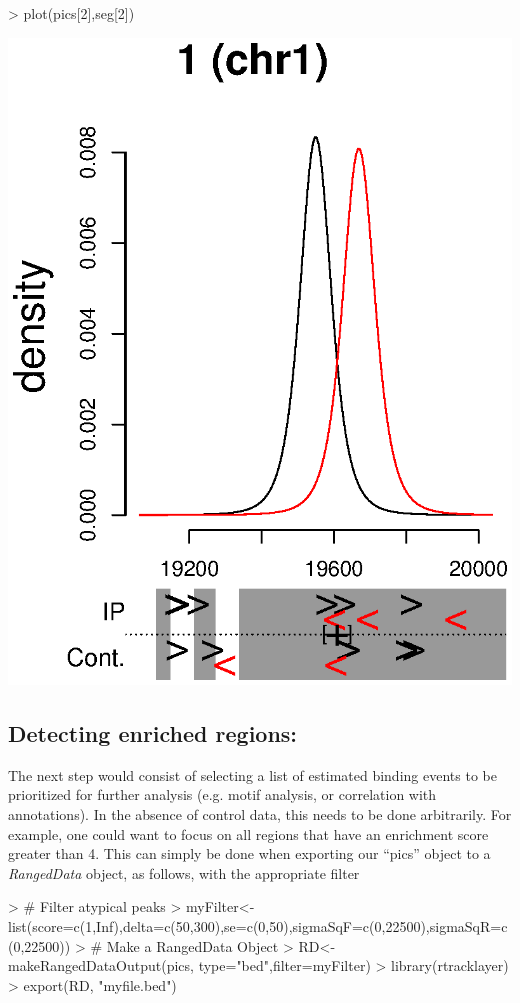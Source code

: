 \documentclass[12pt]{article}
\newcommand{\Robject}[1]{{``#1''}}
\newcommand{\Rclass}[1]{{\textit{#1}}}
\begin{document}
\begin{Schunk}
\begin{Sinput}
> plot(pics[2],seg[2])
\end{Sinput}
\end{Schunk}
\includegraphics{chipData_AD-PICS-plots}

\subsection{Detecting enriched regions:}
The next step would consist of selecting a list of estimated binding events to be prioritized for further analysis (e.g. motif analysis, or correlation with annotations). In the absence of control data, this needs to be done arbitrarily. For example, one could want to focus on all regions that have an enrichment score greater than 4. This can simply be done when exporting our \Robject{pics} object to a \Rclass{RangedData} object, as follows, with the appropriate filter

\begin{Schunk}
\begin{Sinput}
> # Filter atypical peaks
> myFilter<-list(score=c(1,Inf),delta=c(50,300),se=c(0,50),sigmaSqF=c(0,22500),sigmaSqR=c(0,22500))
> # Make a RangedData Object
> RD<-makeRangedDataOutput(pics, type="bed",filter=myFilter) 
> library(rtracklayer)
> export(RD, "myfile.bed")
\end{Sinput}
\end{Schunk}
\end{document}
